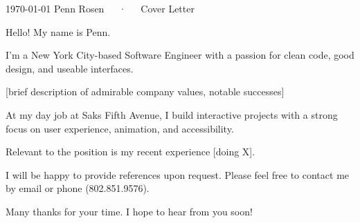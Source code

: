 \documentclass[12pt, letterpaper]{awesome-cv}
\begin{document}
\makecvheader[R]

\makecvfooter
  {\today}
  {Penn Rosen~~~·~~~Cover Letter}
  {}

\makelettertitle

\begin{cvletter}

Hello! My name is Penn.

I'm a New York City-based Software Engineer with a passion for clean code, good design, and useable interfaces.

[brief description of admirable company values, notable successes]


At my day job at Saks Fifth Avenue, I build interactive projects with a strong focus on user experience, animation, and accessibility.

Relevant to the position is my recent experience [doing X]. 


I will be happy to provide references upon request. Please feel free to contact me by email or phone (802.851.9576).

Many thanks for your time. I hope to hear from you soon! 

\end{cvletter}


\makeletterclosing
\end{document}
